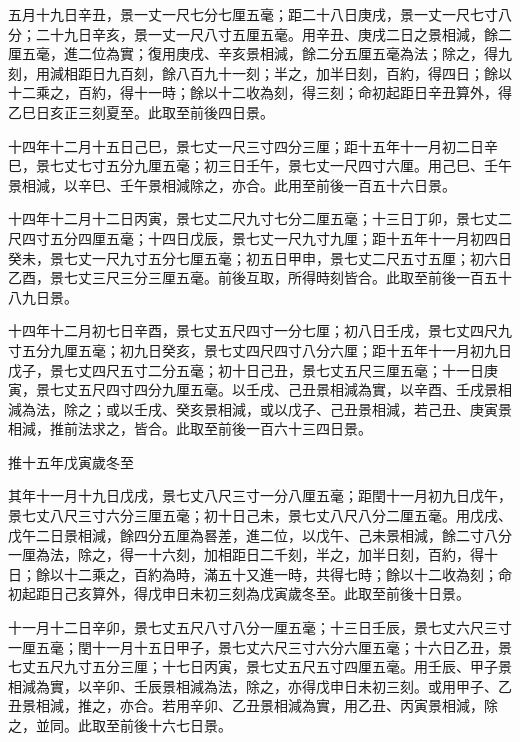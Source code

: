 \begin{pinyinscope}
 五月十九日辛丑，景一丈一尺七分七厘五毫；距二十八日庚戌，景一丈一尺七寸八分；二十九日辛亥，景一丈一尺八寸五厘五毫。用辛丑、庚戌二日之景相減，餘二厘五毫，進二位為實；復用庚戌、辛亥景相減，餘二分五厘五毫為法；除之，得九刻，用減相距日九百刻，餘八百九十一刻；半之，加半日刻，百約，得四日；餘以十二乘之，百約，得十一時；餘以十二收為刻，得三刻；命初起距日辛丑算外，得乙巳日亥正三刻夏至。此取至前後四日景。



 十四年十二月十五日己巳，景七丈一尺三寸四分三厘；距十五年十一月初二日辛巳，景七丈七寸五分九厘五毫；初三日壬午，景七丈一尺四寸六厘。用己巳、壬午景相減，以辛巳、壬午景相減除之，亦合。此用至前後一百五十六日景。



 十四年十二月十二日丙寅，景七丈二尺九寸七分二厘五毫；十三日丁卯，景七丈二尺四寸五分四厘五毫；十四日戊辰，景七丈一尺九寸九厘；距十五年十一月初四日癸未，景七丈一尺九寸五分七厘五毫；初五日甲申，景七丈二尺五寸五厘；初六日乙酉，景七丈三尺三分三厘五毫。前後互取，所得時刻皆合。此取至前後一百五十八九日景。



 十四年十二月初七日辛酉，景七丈五尺四寸一分七厘；初八日壬戌，景七丈四尺九寸五分九厘五毫；初九日癸亥，景七丈四尺四寸八分六厘；距十五年十一月初九日戊子，景七丈四尺五寸二分五毫；初十日己丑，景七丈五尺三厘五毫；十一日庚寅，景七丈五尺四寸四分九厘五毫。以壬戌、己丑景相減為實，以辛酉、壬戌景相減為法，除之；或以壬戌、癸亥景相減，或以戊子、己丑景相減，若己丑、庚寅景相減，推前法求之，皆合。此取至前後一百六十三四日景。



 推十五年戊寅歲冬至



 其年十一月十九日戊戌，景七丈八尺三寸一分八厘五毫；距閏十一月初九日戊午，景七丈八尺三寸六分三厘五毫；初十日己未，景七丈八尺八分二厘五毫。用戊戌、戊午二日景相減，餘四分五厘為晷差，進二位，以戊午、己未景相減，餘二寸八分一厘為法，除之，得一十六刻，加相距日二千刻，半之，加半日刻，百約，得十日；餘以十二乘之，百約為時，滿五十又進一時，共得七時；餘以十二收為刻；命初起距日己亥算外，得戊申日未初三刻為戊寅歲冬至。此取至前後十日景。



 十一月十二日辛卯，景七丈五尺八寸八分一厘五毫；十三日壬辰，景七丈六尺三寸一厘五毫；閏十一月十五日甲子，景七丈六尺三寸六分六厘五毫；十六日乙丑，景七丈五尺九寸五分三厘；十七日丙寅，景七丈五尺五寸四厘五毫。用壬辰、甲子景相減為實，以辛卯、壬辰景相減為法，除之，亦得戊申日未初三刻。或用甲子、乙丑景相減，推之，亦合。若用辛卯、乙丑景相減為實，用乙丑、丙寅景相減，除之，並同。此取至前後十六七日景。




\end{pinyinscope}
